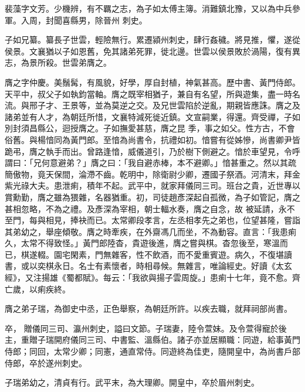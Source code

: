 \begin{pinyinscope}
 裴藻字文芳。少機辨，有不羈之志，為子如太傅主簿。消難鎮北豫，又以為中兵參軍。入周，封聞喜縣男，除晉州
 刺史。



 子如兄纂。纂長子世雲，輕險無行。累遷潁州刺史，肆行姦穢。將見推，懼，遂從侯景。文襄猶以子如恩舊，免其諸弟死罪，徙北邊。世雲以侯景敗於渦陽，復有異志，為景所殺。世雲弟膺之。



 膺之字仲慶。美鬚髯，有風貌，好學，厚自封植，神氣甚高。歷中書、黃門侍郎。天平中，叔父子如執鈞當軸。膺之既宰相猶子，兼自有名望，所與遊集，盡一時名流。與邢子才、王景等，並為莫逆之交。及兄世雲陷於逆亂，期親皆應誅。膺之及諸弟並有人才，為朝廷所惜，文襄特減死徙近鎮。文宣嗣業，得還。齊受禪，子如別封須昌縣公，迴授膺之。子如撫愛甚慈，膺之昆
 季，事之如父。性方古，不會俗舊。與楊愔同為黃門郎。至愔為尚書令，抗禮如初。愔嘗有從姊慘，尚書卿尹皆跪弔，膺之執手而出。曾路逢愔，威儀道引，乃於樹下側避之。愔於車望見，令呼謂曰：「兄何意避弟？」膺之曰：「我自避赤棒，本不避卿。」愔甚重之。然以其疏簡傲物，竟天保間，淪滯不齒。乾明中，除衛尉少卿，遷國子祭酒。河清末，拜金紫光祿大夫。患泄痢，積年不起。武平中，就家拜儀同三司。班台之貴，近世專以賞勳勤，膺之雖為猥雜，名器猶重。初，司徒趙彥深起自孤微，為子如管記，膺之甚相忽略，不為之禮。及彥深為宰相，朝士輻水奏，膺之自念，故
 被延請，永不至門，每與相見，捧袂而已。太常卿段孝言，左丞相孝先之弟也，位望甚隆，嘗詣其弟幼之，舉座傾敬。膺之時牽疾，在外齋馮几而坐，不為動容。直言：「我患痢久，太常不得致怪。」黃門郎陸杳，貴遊後進，膺之嘗與棋。杳忽後至，寒溫而已，棋遂輟。園宅閑素，門無雜客，性不飲酒，而不愛重賓遊。病久，不復堪讀書，或以奕棋永日。名士有素懷者，時相尋候。無雜言，唯論經史。好讀《太玄經》，又注揚雄《蜀都賦》。每云：「我欲與揚子雲周旋。」患痢十七年，竟不愈。齊亡歲，以痢疾終。



 膺之弟子瑞，為御史中丞，正色舉察，為朝廷所許。以疾去職，就拜祠部尚書。



 卒，
 贈儀同三司、瀛州刺史，謚曰文節。子瑞妻，陸令萱妹。及令萱得寵於後主，重贈子瑞開府儀同三司、中書監、溫縣伯。諸子亦並居顯職：同遊，給事黃門侍郎；同回，太常少卿；同憲，通直常侍。同遊終為佳吏，隨開皇中，為尚書戶部侍郎，卒於遂州刺史。



 子瑞弟幼之，清貞有行。武平末，為大理卿。開皇中，卒於眉州刺史。




\end{pinyinscope}
